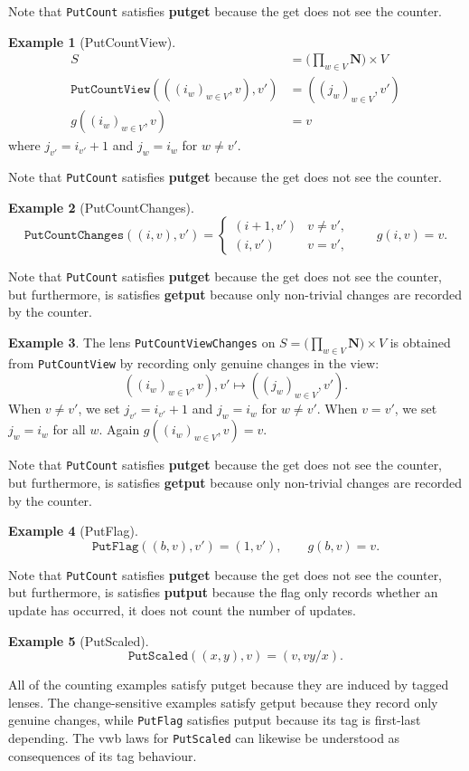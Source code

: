 \documentclass[a4paper,11pt]{article}
\theoremstyle{definition}
\theoremstyle{plain}
\theoremstyle{plain}
\theoremstyle{definition}
\newtheorem{example}{Example}
\begin{document}
Note that \texttt{PutCount} satisfies \textbf{putget} because the get does not see the counter. 
\begin{example}[PutCountView]
\begin{align*}
    S &= \Big(\prod_{w \in V} \mathbf{N}\Big) \times V \\
    \texttt{PutCountView}(((i_w)_{w \in V},v),v') &= ((j_w)_{w \in V},v') \\
    g((i_w)_{w \in V},v) &= v
\end{align*}
where $j_{v'} = i_{v'} + 1$ and $j_w = i_w$ for $w \neq v'$.
\end{example}
Note that \texttt{PutCount} satisfies \textbf{putget} because the get does not see the counter.
\begin{example}[PutCountChanges]
\[
\texttt{PutCountChanges}((i,v),v')=
\begin{cases}
(i+1,v') & v \neq v',\\
(i,v') & v = v',
\end{cases}
\qquad
g(i,v)=v.
\]
\end{example}
Note that \texttt{PutCount} satisfies \textbf{putget} because the get does not see the counter, but furthermore, is satisfies \textbf{getput} because only non-trivial changes are recorded by the counter. 
\begin{example}
The lens \texttt{PutCountViewChanges} on $S = \big(\prod_{w \in V} \mathbf{N}\big) \times V$ is obtained from \texttt{PutCountView} by recording only genuine changes in the view:
\[
((i_w)_{w \in V},v),v' \mapsto ((j_w)_{w \in V},v').
\]
When $v \neq v'$, we set $j_{v'} = i_{v'} + 1$ and $j_w = i_w$ for $w \neq v'$. When $v = v'$, we set $j_w = i_w$ for all $w$. Again $g((i_w)_{w \in V},v)=v$.
\end{example}
Note that \texttt{PutCount} satisfies \textbf{putget} because the get does not see the counter, but furthermore, is satisfies \textbf{getput} because only non-trivial changes are recorded by the counter. 
\begin{example}[PutFlag]
\[
\texttt{PutFlag}((b,v),v')=(1,v'),
\qquad
g(b,v)=v.
\]
\end{example}
Note that \texttt{PutCount} satisfies \textbf{putget} because the get does not see the counter, but furthermore, is satisfies \textbf{putput} because the flag only records whether an update has occurred, it does not count the number of updates. 
\begin{example}[PutScaled]
\[
\texttt{PutScaled}((x,y),v)=(v,vy/x).
\]
\end{example}
All of the counting examples satisfy putget because they are induced by tagged lenses. The change-sensitive examples satisfy getput because they record only genuine changes, while \texttt{PutFlag} satisfies putput because its tag is first-last depending. The vwb laws for \texttt{PutScaled} can likewise be understood as consequences of its tag behaviour.
\end{document}
